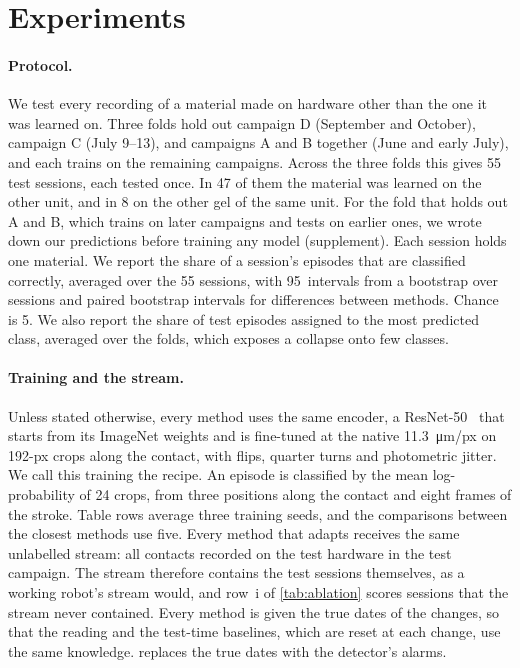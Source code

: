 \section{Experiments}
\label{sec:exp}

\paragraph{Protocol.}
We test every recording of a material made on hardware other than the one it was learned on. Three folds hold out campaign D (September and October), campaign C (July 9--13), and campaigns A and B together (June and early July), and each trains on the remaining campaigns. Across the three folds this gives 55 test sessions, each tested once. In 47 of them the material was learned on the other unit, and in 8 on the other gel of the same unit. For the fold that holds out A and B, which trains on later campaigns and tests on earlier ones, we wrote down our predictions before training any model (supplement). Each session holds one material. We report the share of a session's episodes that are classified correctly, averaged over the 55 sessions, with 95\pct\ intervals from a bootstrap over sessions and paired bootstrap intervals for differences between methods. Chance is 5\pct. We also report the share of test episodes assigned to the most predicted class, averaged over the folds, which exposes a collapse onto few classes.

\paragraph{Training and the stream.}
Unless stated otherwise, every method uses the same encoder, a ResNet-50~\cite{he2016resnet} that starts from its ImageNet weights and is fine-tuned at the native \SI{11.3}{\micro\metre}/px on 192-px crops along the contact, with flips, quarter turns and photometric jitter. We call this training the recipe. An episode is classified by the mean log-probability of 24 crops, from three positions along the contact and eight frames of the stroke. Table rows average three training seeds, and the comparisons between the closest methods use five. Every method that adapts receives the same unlabelled stream: all contacts recorded on the test hardware in the test campaign. The stream therefore contains the test sessions themselves, as a working robot's stream would, and row~i of \cref{tab:ablation} scores sessions that the stream never contained. Every method is given the true dates of the changes, so that the reading and the test-time baselines, which are reset at each change, use the same knowledge.  replaces the true dates with the detector's alarms.

